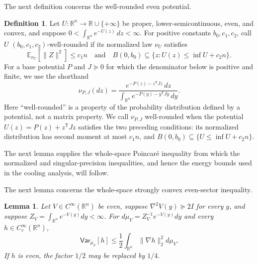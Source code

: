 \documentclass[11pt]{article}
\numberwithin{equation}{section}
\newtheorem{lemma}{Lemma}[section]
\theoremstyle{definition}
\newtheorem{definition}[definition]{Definition}
\newcommand{\E}[2]{\mathbb{E}_{#1}\left[#2\right]}
\newcommand{\V}[2]{\mathsf{Var}_{#1}\left[#2\right]}
\begin{document}
The next definition concerns the well-rounded even potential.

\begin{definition}
\label{run01:def:local-well-rounded}
Let $U:\mathbb R^n\to\mathbb R\cup\{+\infty\}$ be proper, lower-semicontinuous,
even, and convex, and suppose
$0<\int_{\mathbb R^n}e^{-U(z)}\,dz<\infty$.
For positive constants $b_0,c_1,c_2$, call
$U$
$(b_0,c_1,c_2)$-well-rounded if its normalized law
$\nu_U$ satisfies
\[
 \E{\nu_U}{\|Z\|^2}\leq c_1n
 \quad\text{and}\quad
 B(0,b_0)\subseteq\{z:U(z)\leq\inf U+c_2n\}.
\]
For a base potential $P$ and $J\succeq0$ for which the denominator below
is positive and finite, we use the shorthand
\[
 \nu_{P,J}(dz)=
 \frac{e^{-P(z)-z^{\mathsf T} Jz}\,dz}
 {\int_{\mathbb R^n}e^{-P(y)-y^{\mathsf T} Jy}\,dy}.
\]
Here ``well-rounded'' is a property of the probability distribution defined by a
potential, not a matrix property.
We call $\nu_{P,J}$ well-rounded when the potential
$U(z)=P(z)+z^{\mathsf T}Jz$ satisfies the two preceding conditions: its
normalized distribution has second moment at most
$c_1n$, and
$B(0,b_0)\subseteq\{U\leq\inf U+c_2n\}$.
\end{definition}
\space The next lemma supplies the whole-space Poincar\'e inequality from which
the normalized and singular-precision inequalities, and hence the energy bounds
used in the cooling analysis, will follow.

The next lemma concerns the whole-space strongly convex even-sector inequality.

\begin{lemma}
\label{run01:lem:whole-space-even-sector}
Let $V\in C^\infty(\mathbb R^n)$ be even, suppose
$\nabla^2V(y)\succeq2I$ for every
$y$, and suppose
$Z_V=\int_{\mathbb R^n}e^{-V(y)}dy<\infty$.
For $d\mu_V=Z_V^{-1}e^{-V(y)}dy$ and every
$h\in C_c^\infty(\mathbb R^n)$,
\begin{equation}
 \V{\mu_V}{h}
 \leq\frac12\int_{\mathbb R^n}\lVert\nabla h\rVert_2^2d\mu_V.
 \label{run01:eq:whole-space-general}
\end{equation}
If $h$ is even, the factor
$1/2$ may be replaced by
$1/4$.
\end{lemma}
\end{document}
